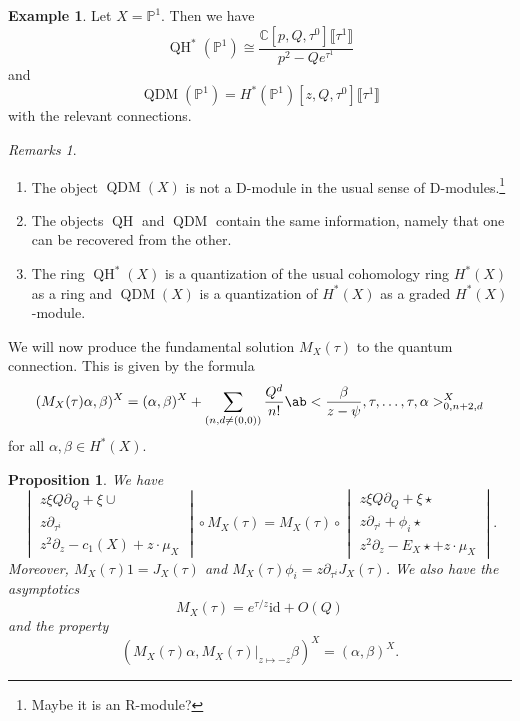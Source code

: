 \documentclass{amsart}
\newtheorem{prop}[thm]{Proposition}
\theoremstyle{definition}
\newtheorem{exm}[thm]{Example}
\theoremstyle{remark}
\newtheorem{rmks}[thm]{Remarks}
\theoremstyle{plain}
\theoremstyle{definition}
\theoremstyle{remark}
\newcommand{\C}{\mathbb{C}}
\renewcommand{\P}{\mathbb{P}}
\newcommand{\mr}[1]{\mathrm{#1}}
\newcommand{\on}[1]{\operatorname{#1}}
\newcommand{\1}{\mathbf{1}}
\newcommand{\2}{\mathbf{2}}
\newcommand{\3}{\mathbf{3}}
\newcommand{\ps}[1]{\lBrack #1 \rBrack}
\DeclareMathOperator{\QH}{QH}
\DeclareMathOperator{\QDM}{QDM}
\begin{document}
\begin{exm}
    Let \(X = \P^1\). Then we have
    \[ \on{QH}^*(\P^1) \cong \frac{\C[p, Q, \tau^0]\ps{\tau^1}}{p^2 - Q e^{\tau^1}} \]
    and
    \[ \on{QDM}(\P^1) = H^*(\P^1)[z, Q, \tau^0]\ps{\tau^1} \]
    with the relevant connections.
\end{exm}

\begin{rmks}\leavevmode
    \begin{enumerate}
        \item The object \(\QDM(X)\) is not a D-module in the usual sense of D-modules.\footnote{Maybe it is an R-module?}
        \item The objects \(\QH\) and \(\QDM\) contain the same information, namely that one can be recovered from the other.
        \item The ring \(\QH^*(X)\) is a quantization of the usual cohomology ring \(H^*(X)\) as a ring and \(\QDM(X)\) is a quantization of \(H^*(X)\) as a graded \(H^*(X)\)-module.
    \end{enumerate}
\end{rmks}

We will now produce the fundamental solution \(M_X(\tau)\) to the quantum connection. This is given by the formula
\[ (M_X(\tau)\alpha, \beta)^X = (\alpha, \beta)^X + \sum_{(n,d \neq (0,0))} \frac{Q^d}{n!} \ab< \frac{\beta}{z-\psi}, \tau, \ldots, \tau, \alpha>_{0,n+2, d}^X \]
for all \(\alpha, \beta \in H^*(X)\).

\begin{prop}\leavevmode
    We have
    \[ \begin{vmatrix}
        z \xi Q \partial_Q + \xi \cup \\
        z \partial_{\tau^i} \\
        z^2 \partial_z - c_1(X) + z \cdot \mu_X
    \end{vmatrix} \circ M_X(\tau) = M_X(\tau) \circ \begin{vmatrix}
        z \xi Q \partial_Q + \xi \star \\
        z \partial_{\tau^i} + \phi_i \star \\
        z^2 \partial_z - E_X \star + z \cdot \mu_X
    \end{vmatrix}. \]
    Moreover, \(M_X(\tau) 1 = J_X(\tau)\) and \(M_X(\tau) \phi_i = z \partial_{\tau^i} J_X(\tau)\). We also have the asymptotics
    \[ M_X(\tau) = e^{\tau/z} \mr{id} + O(Q) \]
    and the property
    \[ (M_X(\tau) \alpha, M_X(\tau)|_{z \mapsto -z} \beta)^X = (\alpha, \beta)^X. \]
\end{prop}
\end{document}
